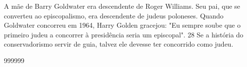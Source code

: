  
\par
 
A mãe de Barry Goldwater era descendente de Roger Williams. Seu pai, que se converteu ao episcopalismo, era descendente de judeus poloneses. Quando Goldwater concorreu em 1964, Harry Golden gracejou: "Eu sempre soube que o primeiro judeu a concorrer à presidência seria um episcopal".
 {\color{blue} 28}  
Se a história do conservadorismo servir de guia, talvez ele devesse ter concorrido como judeu.
 
\par
  
 
999999
